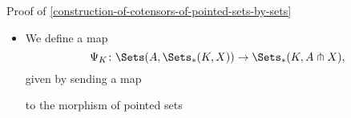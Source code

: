 \begin{Proof}{Proof of \cref{construction-of-cotensors-of-pointed-sets-by-sets}}
\begin{itemize}
\begin{enumerate}
                    \begin{align*}
                        \xi(k) &= [(x^{k}_{a})_{a\in A}]\\
                               &= [(y^{k}_{a})_{a\in A}]
                    \end{align*}
                    with $x^{k}_{a}\neq y^{k}_{a}$ for some $a\in A$. Then there exist $a_{x},a_{y}\in A$ such that $x^{k}_{a_{x}}=y^{k}_{a_{y}}=x_{0}$. The equivalence relation $\unsim$ on $\prod_{a\in A}X$ then forces
                    \begin{align*}
                        [(x^{k}_{a})_{a\in A}] &= [(x_{0})_{a\in A}],\\
                        [(y^{k}_{a})_{a\in A}] &= [(x_{0})_{a\in A}],
                    \end{align*}
                    however, and $\xi_{a}(k)$ is defined to be $x_{0}$ in this case.
                \item The map $\xi_{a}$ is indeed a morphism of pointed sets, as we have
                    \[
                        \xi_{a}(k_{0})%
                        =%
                        x_{0}
                    \]%
                    since $\xi(k_{0})=[(x_{0})_{a\in A}]$ as $\xi$ is a morphism of pointed sets and $\xi_{a}(k_{0})$, defined to be the $a$th component of $[(x_{0})_{a\in A}]$, is equal to $x_{0}$.
            \end{enumerate}
        \item{}We define a map
            \[
                \Psi_{K}%
                \colon%
                \Sets(A,\Sets_{*}(K,X))%
                \to%
                \Sets_{*}(K,A\pitchfork X),%
            \]%
            given by sending a map
            \begin{webcompile}
                \phantom{\xi\colon}
            \end{webcompile}
            to the morphism of pointed sets
            \[
\]
\end{itemize}
\end{Proof}
